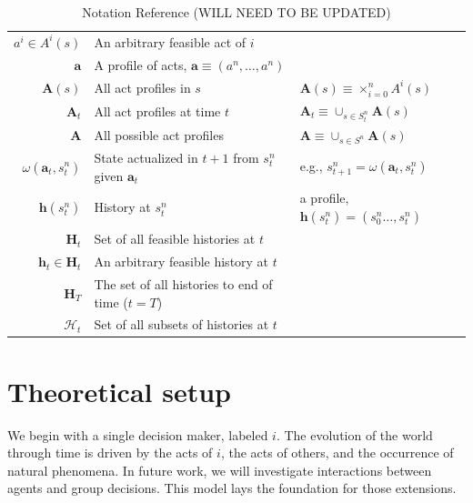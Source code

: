 \documentclass[
11pt,
titlepage,
reqno,
]{article}%
\theoremstyle{definition}
\begin{document}
\begin{table}
\begin{tabular}{@{}rll@{}}
$a^i\in A^i(s)$                                    & An arbitrary feasible act of $i$                      & \\
$\mathbf{a}$                                       & A profile of acts, $\mathbf{a}\equiv(a^n,\ldots,a^n)$ & \\
$\mathbf{A}(s)$                                    & All act profiles in $s$                               & $\mathbf{A}(s)\equiv \times_{i=0}^n A^i(s)$\\
$\mathbf{A}_t$                                     & All act profiles at time $t$                          & $\mathbf{A}_t\equiv \cup_{s\in S^n_t} \mathbf{A}(s)$\\
$\mathbf{A}$                                       & All possible act profiles                             & $\mathbf{A}\equiv \cup_{s\in S^n} \mathbf{A}(s)$\\
$\omega(\mathbf{a}_t,s^n_t)$                       & State actualized in $t+1$ from $s^n_t$ given $\mathbf{a}_t$    & e.g., $s^n_{t+1}=\omega(\mathbf{a}_t,s^n_t)$\\
$\mathbf{h}(s^n_t)$                                & History at $s^n_t$                                    & a profile, $\mathbf{h}(s^n_t)=(s^n_0\ldots,s^n_t)$\\
$\mathbf{H}_t$                                     & Set of all feasible histories at $t$                  & \\
$\mathbf{h}_t\in \mathbf{H}_t$                     & An arbitrary feasible history at $t$                  & \\
$\mathbf{H}_T$                                     & The set of all histories to end of time ($t=T$)       & \\
$\mathcal{H}_t$                                    & Set of all subsets of histories at $t$                & \\
\bottomrule
\end{tabular}
\caption{Notation Reference (WILL NEED TO BE UPDATED)}\label{Tab: Notation}
\end{table}
\pagebreak



\section{Theoretical setup}\label{sec:world}

We begin with a single decision maker, labeled $i$. 
The evolution of the world through time is driven by the acts of $i$, the acts of others, and the occurrence of natural phenomena. 
In future work, we will investigate interactions between agents and group decisions.
This model lays the foundation for those extensions.
\end{document}
